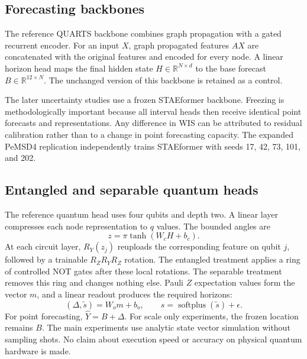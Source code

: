 \documentclass[pdflatex,sn-mathphys-num]{sn-jnl}
\begin{document}
\subsection{Forecasting backbones}\label{subsec:backbones}

The reference QUARTS backbone combines graph propagation with a gated recurrent encoder. For an input \(X\), graph propagated features \(AX\) are concatenated with the original features and encoded for every node. A linear horizon head maps the final hidden state \(H\in\mathbb{R}^{N\times d}\) to the base forecast \(B\in\mathbb{R}^{12\times N}\). The unchanged version of this backbone is retained as a control.

The later uncertainty studies use a frozen STAEformer backbone. Freezing is methodologically important because all interval heads then receive identical point forecasts and representations. Any difference in WIS can be attributed to residual calibration rather than to a change in point forecasting capacity. The expanded PeMSD4 replication independently trains STAEformer with seeds 17, 42, 73, 101, and 202.

\subsection{Entangled and separable quantum heads}\label{subsec:vqc}

The reference quantum head uses four qubits and depth two. A linear layer compresses each node representation to \(q\) values. The bounded angles are
\begin{equation}
 z=\pi\tanh(W_cH+b_c).
\label{eq:compress}
\end{equation}
At each circuit layer, \(R_Y(z_j)\) reuploads the corresponding feature on qubit \(j\), followed by a trainable \(R_ZR_YR_Z\) rotation. The entangled treatment applies a ring of controlled NOT gates after these local rotations. The separable treatment removes this ring and changes nothing else. Pauli \(Z\) expectation values form the vector \(m\), and a linear readout produces the required horizons:
\begin{equation}
 (\Delta,\widetilde{s})=W_om+b_o,\qquad s=\operatorname{softplus}(\widetilde{s})+\epsilon .
\label{eq:readout}
\end{equation}
For point forecasting, \(\widehat{Y}=B+\Delta\). For scale only experiments, the frozen location remains \(B\). The main experiments use analytic state vector simulation without sampling shots. No claim about execution speed or accuracy on physical quantum hardware is made.
\end{document}
